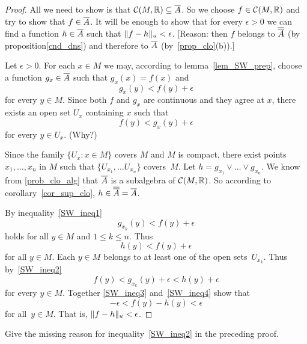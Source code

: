 \begin{proof} All we need to show is that $\mathcal{C}(M,\mathbb{R}) \subseteq \overline{A}$.  So we choose
$f \in \mathcal{C}(M,\mathbb{R})$ and try to show that $f \in \overline{A}$.  It will be enough to show that for
every $\epsilon > 0$ we can find a function $h \in \overline{A}$ such that $\lVert f - h\rVert_u <
\epsilon$. [Reason: then $f$ belongs to $\overline{\overline{A}}$ (by proposition\ref{cnd_dns}) and
therefore to $\overline{A}$ (by~\ref{prop_clo}(b)).]

Let $\epsilon > 0$.  For each $x \in M$ we may, according to lemma~\ref{lem_SW_prep}, choose a
function $g_x \in \overline{A}$ such that $g_x(x) = f(x)$ and
 \begin{equation}\label{SW_ineq1}
       g_x(y) < f(y) + \epsilon
 \end{equation}
for every $y \in M$.  Since both $f$ and $g_x$ are continuous and they agree at $x$, there
exists an open set $U_x$ containing $x$ such that
 \begin{equation}\label{SW_ineq2}
       f(y) < g_x(y) + \epsilon
 \end{equation}
for every $y \in U_x$.  (Why?)

Since the family $\{U_x\colon x \in M\}$ covers $M$ and $M$ is compact, there exist points
$x_1, \dots, x_n$ in $M$ such that $\{U_{x_1}, \dots U_{x_n}\}$ covers~$M$.  Let $h = g_{x_1}
\lor \dots \lor g_{x_n}$.  We know from \ref{prob_clo_alg} that $\overline{A}$ is a subalgebra of
$\mathcal{C}(M,\mathbb{R})$.  So according to corollary~\ref{cor_sup_clo}, $h \in \overline{\overline{A}} = \overline{A}$.

By inequality~\eqref{SW_ineq1}
  \[ g_{x_k}(y) < f(y) + \epsilon \]
holds for all $y \in M$ and $1 \le k \le n$.  Thus
 \begin{equation}\label{SW_ineq3}
       h(y) < f(y) + \epsilon
 \end{equation}
for all $y \in M$.  Each $y \in M$ belongs to at least one of the open sets~$U_{x_k}$.  Thus
by~\eqref{SW_ineq2}
 \begin{equation}\label{SW_ineq4}
       f(y) < g_{x_k}(y) + \epsilon < h(y) + \epsilon
 \end{equation}
for every $y \in M$.  Together \eqref{SW_ineq3} and~\eqref{SW_ineq4} show that
  \[ -\epsilon < f(y) - h(y) < \epsilon \]
for all~$y \in M$.  That is, $\lVert f - h\rVert_u < \epsilon$.
\end{proof}

\begin{prob} Give the missing reason for inequality~\eqref{SW_ineq2} in the preceding proof.
\end{prob}


